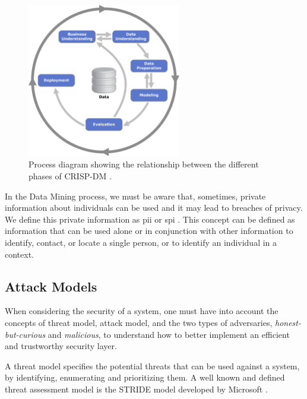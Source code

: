 \begin{figure}[!ht]
  \centering
  \includegraphics[width=0.60\textwidth]{images/CRISP-DM_Process_Diagram.png}
  \caption{Process diagram showing the relationship between the different phases of CRISP-DM \cite{wirth2000crisp}.}
  \label{fig:crisp-dm}
\end{figure}



In the Data Mining process, we must be aware that, sometimes, private information about individuals can be used and it may lead to breaches of privacy. We define this private information as \ac{pii} or \ac{spi} \cite{schwartz2011pii}. This concept can be defined as information that can be used alone or in conjunction with other information to identify, contact, or locate a single person, or to identify an individual in a context.



\subsection{Attack Models}
\label{ssec:AttackModels}

When considering the security of a system, one must have into account the concepts of threat model, attack model, and the two types of adversaries, \textit{honest-but-curious} and \textit{malicious}, to understand how to better implement an efficient and trustworthy security layer.

A threat model specifies the potential threats that can be used against a system, by identifying, enumerating and prioritizing them. A well known and defined threat assessment model is the STRIDE model developed by Microsoft \cite{hafiz2007organizing}.

